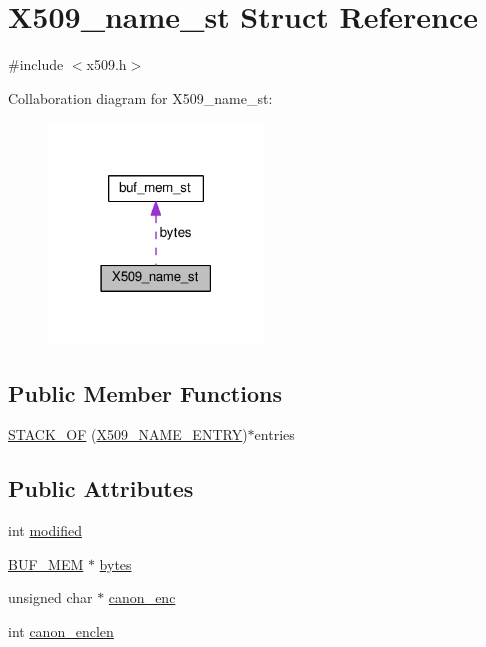 \hypertarget{struct_x509__name__st}{}\section{X509\+\_\+name\+\_\+st Struct Reference}
\label{struct_x509__name__st}


{\ttfamily \#include $<$x509.\+h$>$}



Collaboration diagram for X509\+\_\+name\+\_\+st\+:
\nopagebreak
\begin{figure}[H]
\begin{center}
\leavevmode
\includegraphics[width=162pt]{struct_x509__name__st__coll__graph}
\end{center}
\end{figure}
\subsection*{Public Member Functions}
\begin{DoxyCompactItemize}
\item 
\hyperlink{struct_x509__name__st_a309fcb2ef5136df31912ba38a423fbd0}{S\+T\+A\+C\+K\+\_\+\+OF} (\hyperlink{x509_8h_af3ca6ec6d07932d262daab57dab9cdd0}{X509\+\_\+\+N\+A\+M\+E\+\_\+\+E\+N\+T\+RY})$\ast$entries
\end{DoxyCompactItemize}
\subsection*{Public Attributes}
\begin{DoxyCompactItemize}
\item 
int \hyperlink{struct_x509__name__st_a1bbfbc394e6971bc55d4f9ec4c22ae44}{modified}
\item 
\hyperlink{ossl__typ_8h_aaea4d745bf2689d2009791186616bb3c}{B\+U\+F\+\_\+\+M\+EM} $\ast$ \hyperlink{struct_x509__name__st_a673c31a6033851f510b2e74770f43224}{bytes}
\item 
unsigned char $\ast$ \hyperlink{struct_x509__name__st_af5bcedafa7eb3039090945fec07a0ed7}{canon\+\_\+enc}
\item 
int \hyperlink{struct_x509__name__st_a264a0973bed1cf3905e3f12b5af1d269}{canon\+\_\+enclen}
\end{DoxyCompactItemize}


